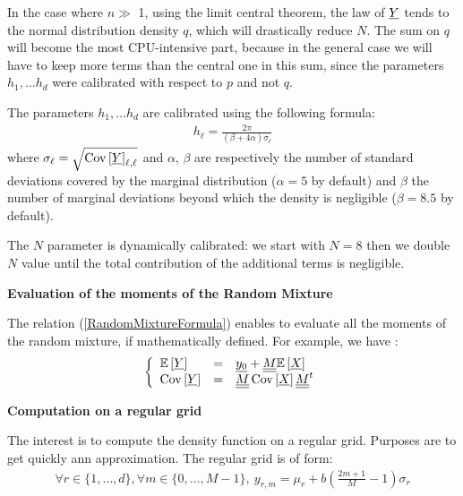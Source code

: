 {  In the case where $n \gg $ 1, using the limit central theorem, the law of ${\underline{Y}} $ tends to the normal distribution density $q$,
  which will drastically reduce $N$.  The sum on $q$ will become the most CPU-intensive part, because in the general case we will
  have to keep more terms than the central one in this sum, since the parameters $ h_1, \dots  h_d$ were calibrated
  with respect to $p$ and not $q$.

  The parameters $h_1, \dots  h_d$ are calibrated using the following formula:
  \begin{align}
    h_\ell = \frac{2\pi}{(\beta+4\alpha)\sigma_\ell}
  \end{align}
  where $\sigma_\ell=\sqrt{{\rm Cov}\left[ {\underline{Y}} \right]_{\ell,\ell}}$ and $\alpha$, $\beta$ are respectively the number of standard deviations covered by the marginal distribution
  ($\alpha=5$ by default) and $\beta$ the number of marginal deviations beyond which the density is negligible ($\beta=8.5$ by default).

  The $N$ parameter is dynamically calibrated: we start with $N=8$ then we double $N$ value until the total contribution of the additional terms is negligible.

  \vspace*{2mm}

  {\bf Evaluation of the moments of the Random Mixture}

  The relation (\ref{RandomMixtureFormula}) enables to evaluate all the moments of the random mixture, if mathematically defined. For example, we have :
  \begin{align*}
    \left\{
    \begin{array}{lcl}
      {\mathbb E}\left[ {\underline{Y}} \right] & = & {\underline{y_0}} + {\underline{\underline{M}}}{\mathbb E}\left[ {\underline{X}} \right] \\
      {\rm Cov}\left[ {\underline{Y}} \right] & = & {\underline{\underline{M}}}\,{\rm Cov}\left[ {\underline{X}} \right]{\underline{\underline{M}}}^t
    \end{array}
    \right.
  \end{align*}
  \vspace*{2mm}
  
  {\bf Computation on a regular grid}

  The interest is to compute the density function on a regular grid. Purposes are to get quickly ann approximation.
  The regular grid is of form:
  \begin{align}
    \forall r\in\{1,\hdots,d\},\forall m\in\{0,\hdots,M-1\},\:y_{r,m}=\mu_r+b\left(\frac{2m+1}{M} - 1\right)\sigma_r
  \end{align}

}
